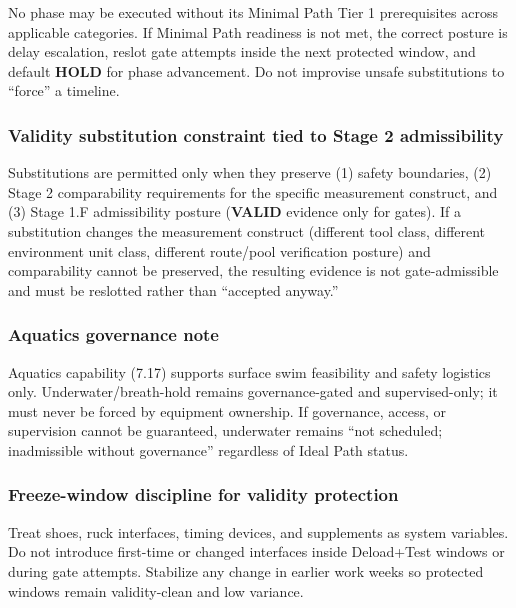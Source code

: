 \documentclass[10pt]{article}
\begin{document}
No phase may be executed without its Minimal Path Tier 1 prerequisites across applicable categories. If Minimal Path readiness is not met, the correct posture is delay escalation, reslot gate attempts inside the next protected window, and default \textbf{HOLD} for phase advancement. Do not improvise unsafe substitutions to “force” a timeline.

\subsubsection*{Validity substitution constraint tied to Stage 2 admissibility}

Substitutions are permitted only when they preserve (1) safety boundaries, (2) Stage 2 comparability requirements for the specific measurement construct, and (3) Stage 1.F admissibility posture (\textbf{VALID} evidence only for gates). If a substitution changes the measurement construct (different tool class, different environment unit class, different route/pool verification posture) and comparability cannot be preserved, the resulting evidence is not gate-admissible and must be reslotted rather than “accepted anyway.”

\subsubsection*{Aquatics governance note}

Aquatics capability (7.17) supports surface swim feasibility and safety logistics only. Underwater/breath-hold remains governance-gated and supervised-only; it must never be forced by equipment ownership. If governance, access, or supervision cannot be guaranteed, underwater remains “not scheduled; inadmissible without governance” regardless of Ideal Path status.

\subsubsection*{Freeze-window discipline for validity protection}

Treat shoes, ruck interfaces, timing devices, and supplements as system variables. Do not introduce first-time or changed interfaces inside Deload+Test windows or during gate attempts. Stabilize any change in earlier work weeks so protected windows remain validity-clean and low variance.
\end{document}
